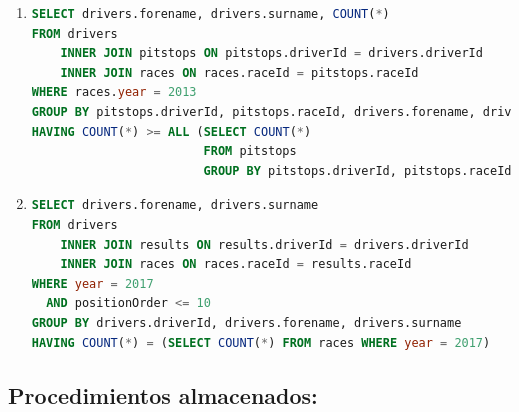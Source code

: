 \documentclass{db-practice}
\begin{document}
\begin{enumerate}
\item
\begin{lstlisting}[language=SQL]
SELECT drivers.forename, drivers.surname, COUNT(*)
FROM drivers
    INNER JOIN pitstops ON pitstops.driverId = drivers.driverId
    INNER JOIN races ON races.raceId = pitstops.raceId
WHERE races.year = 2013
GROUP BY pitstops.driverId, pitstops.raceId, drivers.forename, drivers.surname
HAVING COUNT(*) >= ALL (SELECT COUNT(*)
                        FROM pitstops
                        GROUP BY pitstops.driverId, pitstops.raceId)  
\end{lstlisting}

\item
\begin{lstlisting}[language=SQL]
SELECT drivers.forename, drivers.surname
FROM drivers 
    INNER JOIN results ON results.driverId = drivers.driverId
    INNER JOIN races ON races.raceId = results.raceId
WHERE year = 2017
  AND positionOrder <= 10
GROUP BY drivers.driverId, drivers.forename, drivers.surname
HAVING COUNT(*) = (SELECT COUNT(*) FROM races WHERE year = 2017)
\end{lstlisting}

\end{enumerate}

\subsection{Procedimientos almacenados:}
\end{document}
